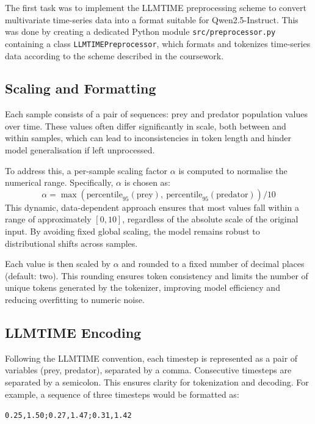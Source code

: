 \documentclass[a4paper,12pt]{article}
\begin{document}
The first task was to implement the LLMTIME preprocessing scheme \citep{gruver2023language} to convert multivariate time-series data into a format suitable for Qwen2.5-Instruct. This was done by creating a dedicated Python module \texttt{src/preprocessor.py} containing a class \texttt{LLMTIMEPreprocessor}, which formats and tokenizes time-series data according to the scheme described in the coursework.

\subsection*{Scaling and Formatting}

Each sample consists of a pair of sequences: prey and predator population values over time. These values often differ significantly in scale, both between and within samples, which can lead to inconsistencies in token length and hinder model generalisation if left unprocessed.

To address this, a per-sample scaling factor $\alpha$ is computed to normalise the numerical range. Specifically, $\alpha$ is chosen as:
\begin{equation}
\alpha = \max\left(\text{percentile}_{95}(\text{prey}),\ \text{percentile}_{95}(\text{predator})\right) / 10
\end{equation}
This dynamic, data-dependent approach ensures that most values fall within a range of approximately $[0, 10]$, regardless of the absolute scale of the original input. By avoiding fixed global scaling, the model remains robust to distributional shifts across samples.

Each value is then scaled by $\alpha$ and rounded to a fixed number of decimal places (default: two). This rounding ensures token consistency and limits the number of unique tokens generated by the tokenizer, improving model efficiency and reducing overfitting to numeric noise.

\subsection*{LLMTIME Encoding}

Following the LLMTIME convention, each timestep is represented as a pair of variables (prey, predator), separated by a comma. Consecutive timesteps are separated by a semicolon. This ensures clarity for tokenization and decoding. For example, a sequence of three timesteps would be formatted as:
\begin{center}
\texttt{0.25,1.50;0.27,1.47;0.31,1.42}
\end{center}
\end{document}
